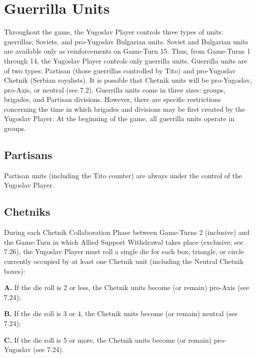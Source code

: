 \section{Guerrilla Units}\label{sec:7.0}


\begin{generalrule}
Throughout the game, the Yugoslav Player controls three types of units: guerrillas, Soviets, and pro-Yugoslav Bulgarian units. Soviet and Bulgarian units are available only as reinforcements on Game-Turn 15. Thus, from Game-Turns 1 through 14, the Yugoslav Player controls only guerrilla units. Guerrilla units are of two types: Partisan (those guerrillas controlled by Tito) and pro-Yugoslav Chetnik (Serbian royalists). It is possible that Chetnik units will be pro-Yugoslav, pro-Axis, or neutral (see 7.2). Guerrilla units come in three sizes: groups, brigades, and Partisan divisions. However, there are specific restrictions concerning the time in which brigades and divisions may be first created by the Yugoslav Player. At the beginning of the game, all guerrilla units operate in groups.
\end{generalrule}

\subsection{Partisans}\label{sec:7.1}

Partisan units (including the Tito counter) are always under the control of the Yugoslav Player.

\subsection{Chetniks}\label{sec:7.2}

 During each Chetnik Collaboration Phase between Game-Turns 2 (inclusive) and the Game-Turn in which Allied Support Withdrawal takes place (exclusive; see 7.26), the Yugoslav Player must roll a single die for each box, triangle, or circle currently occupied by at least one Chetnik unit (including the Neutral Chetnik boxes):

\textbf{A.} If the die roll is 2 or less, the Chetnik units become (or remain) pro-Axis (see 7.24);

\textbf{B.} If the die roll is 3 or 4, the Chetnik units become (or remain) neutral (see 7.24);

\textbf{C.} If the die roll is 5 or more, the Chetnik units become (or remain) pro-Yugoslav (see 7.24).

